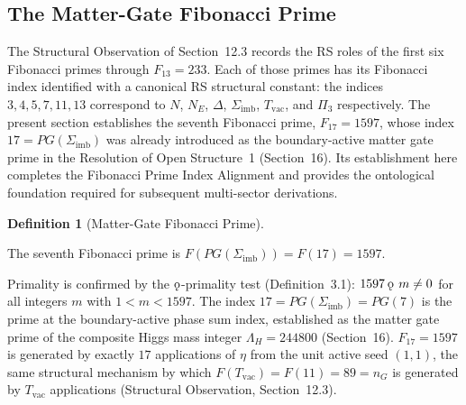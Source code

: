 \documentclass[11pt, letterpaper]{article}
\newcommand{\koppa}{\mathbin{\text{\rm\k{o}}}}
\theoremstyle{definition}
\newtheorem{definition}{Definition}[section]
\theoremstyle{plain}
\begin{document}
\subsection{The Matter-Gate Fibonacci Prime}

The Structural Observation of Section~12.3 records the RS roles of the first six Fibonacci
primes through $F_{13} = 233$. Each of those primes has its Fibonacci index identified with a
canonical RS structural constant: the indices $3, 4, 5, 7, 11, 13$ correspond to $N$, $N_E$,
$\Delta$, $\Sigma_{\mathrm{imb}}$, $T_{\mathrm{vac}}$, and $\Pi_3$ respectively. The present
section establishes the seventh Fibonacci prime, $F_{17} = 1597$, whose index $17 =
PG(\Sigma_{\mathrm{imb}})$ was already introduced as the boundary-active matter gate prime in
the Resolution of Open Structure~1 (Section~16). Its establishment here completes the Fibonacci
Prime Index Alignment and provides the ontological foundation required for subsequent
multi-sector derivations.

\begin{definition}[Matter-Gate Fibonacci Prime]
\begin{rsbox}
The seventh Fibonacci prime is $F(PG(\Sigma_{\mathrm{imb}})) = F(17) = 1597$.

Primality is confirmed by the $\koppa$-primality test (Definition~3.1):
$1597 \koppa\, m \neq 0$ for all integers $m$ with $1 < m < 1597$. The index
$17 = PG(\Sigma_{\mathrm{imb}}) = PG(7)$ is the prime at the boundary-active phase sum
index, established as the matter gate prime of the composite Higgs mass integer
$\Lambda_H = 244800$ (Section~16). $F_{17} = 1597$ is generated by exactly $17$
applications of $\eta$ from the unit active seed $(1,1)$, the same structural mechanism by
which $F(T_{\mathrm{vac}}) = F(11) = 89 = n_G$ is generated by $T_{\mathrm{vac}}$
applications (Structural Observation, Section~12.3).
\end{rsbox}
\end{definition}
\end{document}
